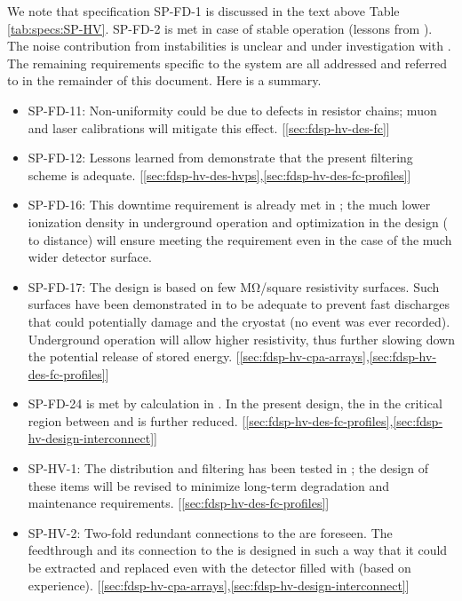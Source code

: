 
We note that specification SP-FD-1 is discussed in the text above Table \ref{tab:specs:SP-HV}. SP-FD-2  is met in case of stable  operation (lessons from ). The noise contribution from  instabilities is unclear and under investigation with . The remaining requirements specific to the  system are all addressed and referred to in the remainder of this document. Here is a summary. 

\begin{itemize}
\item SP-FD-11: Non-uniformity could be due to defects in resistor chains; muon and laser calibrations will mitigate this effect. [\ref{sec:fdsp-hv-des-fc}] %
\item SP-FD-12: Lessons learned from  demonstrate that the present filtering scheme is adequate. [\ref{sec:fdsp-hv-des-hvps},\ref{sec:fdsp-hv-des-fc-profiles}] %
\item SP-FD-16: This downtime requirement is already met in ; the much lower ionization density in underground operation and optimization in the design ( to  distance) will ensure meeting the requirement even in the case of the much wider detector surface. %
\item SP-FD-17: The  design is based on few \si{\mega\ohm}/square resistivity surfaces. Such surfaces have been demonstrated in  to be adequate to prevent fast discharges that could potentially damage  and the cryostat (no event was ever recorded). Underground operation will allow higher resistivity, thus further slowing down the potential release of stored energy. [\ref{sec:fdsp-hv-cpa-arrays},\ref{sec:fdsp-hv-des-fc-profiles}] %
\item SP-FD-24 is met by calculation in . In the present design, the \efield in the critical region between  and  is further reduced. [\ref{sec:fdsp-hv-des-fc-profiles},\ref{sec:fdsp-hv-design-interconnect}] %
\item SP-HV-1: The  distribution and filtering has been tested in ; the design of these items will be revised to minimize long-term degradation and maintenance requirements.  [\ref{sec:fdsp-hv-des-fc-profiles}] %
\item SP-HV-2: Two-fold redundant connections to the  are foreseen. The  feedthrough and its connection to the  is designed in such a way that it could be extracted and replaced even with the detector filled with  (based on  experience). [\ref{sec:fdsp-hv-cpa-arrays},\ref{sec:fdsp-hv-design-interconnect}] %
\end{itemize}

